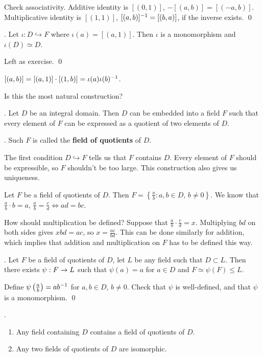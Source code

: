 \pf Check associativity. Additive identity is \([(0, 1)]\), \(-[(a, b)] = [(-a, b)]\). Multiplicative identity is \([(1, 1)]\), \([(a, b)]^{-1} = [(b, a)]\), if the inverse exists. \qed

\lemma. Let \(\iota : D \hookrightarrow F\) where \(\iota(a) = [(a, 1)]\). Then \(\iota\) is a monomorphism and \(\iota(D) \simeq D\).

\pf Left as exercise. \qed

\rmk \([(a, b)] = [(a, 1)] \cdot [(1, b)] = \iota(a) \iota(b)^{-1}\).

Is this the most natural construction?

\thm. Let \(D\) be an integral domain. Then \(D\) can be embedded into a field \(F\) such that every element of \(F\) can be expressed as a quotient of two elements of \(D\).

.  Such \(F\) is called the \textbf{field of quotients} of \(D\).

\rmk The first condition \(D \hookrightarrow F\) tells us that \(F\) contains \(D\). Every element of \(F\) should be expressible, so \(F\) shouldn't be too large. This construction also gives us uniqueness.

Let \(F\) be a field of quotients of \(D\). Then \(F = \left\{\frac{a}{b} : a, b \in D,\, b \neq 0\right\}\). We know that \(\frac{a}{b} \cdot b = a\), \(\frac{a}{b} = \frac{c}{d} \iff ad = bc\).

How should multiplication be defined? Suppose that \(\frac{a}{b} \cdot \frac{c}{d} = x\). Multiplying \(bd\) on both sides gives \(xbd = ac\), so \(x = \frac{ac}{bd}\). This can be done similarly for addition, which implies that addition and multiplication on \(F\) has to be defined this way.

\thm. Let \(F\) be a field of quotients of \(D\), let \(L\) be any field such that \(D \subset L\). Then there exists \(\psi : F \rightarrow L\) such that \(\psi(a) = a\) for \(a \in D\) and \(F \simeq \psi(F) \leq L\).

\pf Define \(\psi\left( \frac{a}{b} \right) = ab^{-1}\) for \(a, b \in D\), \(b \neq 0\). Check that \(\psi\) is well-defined, and that \(\psi\) is a monomorphism. \qed

\cor.
\begin{enumerate}
    \item Any field containing \(D\) contains a field of quotients of \(D\).
    \item Any two fields of quotients of \(D\) are isomorphic.
\end{enumerate}


